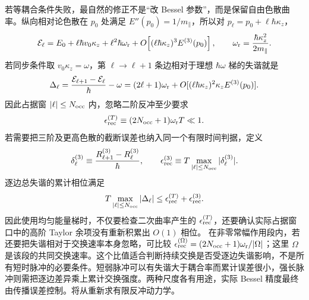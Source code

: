 若等耦合条件失败，最自然的修正不是“改 Bessel 参数”，而是保留自由色散曲率。纵向相对论色散在 $p_0$ 处满足 $E''(p_0)=1/m_\parallel$，所以对 $p_\ell=p_0+\ell\hbar \kappa_z$，
\begin{equation}
{
\mathcal E_\ell
=E_0+\ell\hbar v_0\kappa_z
+\ell^2\hbar\omega_{\rm r}
+O\!\left[(\ell\hbar \kappa_z)^3E^{(3)}(p_0)\right],
\qquad
\omega_{\rm r}=\frac{\hbar \kappa_z^2}{2m_\parallel}.}
\label{eq:pinem_recoil_lattice_expansion}
\end{equation}
若同步条件取 $v_0\kappa_z=\omega$，第 $\ell\to\ell+1$ 条边相对于理想 $\hbar\omega$ 梯的失谐就是
\begin{equation}
{
\Delta_\ell
=\frac{\mathcal E_{\ell+1}-\mathcal E_\ell}{\hbar}-\omega
=(2\ell+1)\omega_{\rm r}+O[(\ell\hbar \kappa_z)^2\kappa_zE^{(3)}(p_0)].}
\label{eq:pinem_recoil_edge_detuning}
\end{equation}
因此占据窗 $|\ell|\le N_{\rm occ}$ 内，忽略二阶反冲至少要求
\begin{equation}
{
\epsilon_{\rm rec}^{(T)}
\equiv(2N_{\rm occ}+1)\omega_{\rm r}T\ll1.}
\label{eq:pinem_recoil_phase_condition}
\end{equation}
若需要把三阶及更高色散的截断误差也纳入同一个有限时间判据，定义
\[
\delta_\ell^{(3)}\equiv
\frac{R_{\ell+1}^{(3)}-R_\ell^{(3)}}{\hbar},
\qquad
\epsilon_{\rm rec}^{(3)}\equiv
T\max_{|\ell|\le N_{\rm occ}}|\delta_\ell^{(3)}|.
\]
逐边总失谐的累计相位满足
\begin{equation}
{
T\max_{|\ell|\le N_{\rm occ}}|\Delta_\ell|
\le
\epsilon_{\rm rec}^{(T)}+\epsilon_{\rm rec}^{(3)}.}
\label{eq:pinem_recoil_total_phase_bound}
\end{equation}
因此使用均匀能量梯时，不仅要检查二次曲率产生的 $\epsilon_{\rm rec}^{(T)}$，还要确认实际占据窗口中的高阶 Taylor 余项没有重新积累出 $O(1)$ 相位。
在非零常幅作用段内，若还要把失谐相对于交换速率本身忽略，可比较 $\epsilon_{\rm rec}^{(\Omega)}=(2N_{\rm occ}+1)\omega_{\rm r}/|\Omega|$；这里 $\Omega$ 是该段的共同交换速率。这个比值适合判断持续交换是否受逐边失谐影响，不是所有短时脉冲的必要条件。短弱脉冲可以有失谐大于耦合率而累计误差很小，强长脉冲则需把逐边差异乘上累计交换强度。两种尺度各有用途，实际 Bessel 精度最终由传播误差控制。将从重新求有限反冲动力学。


